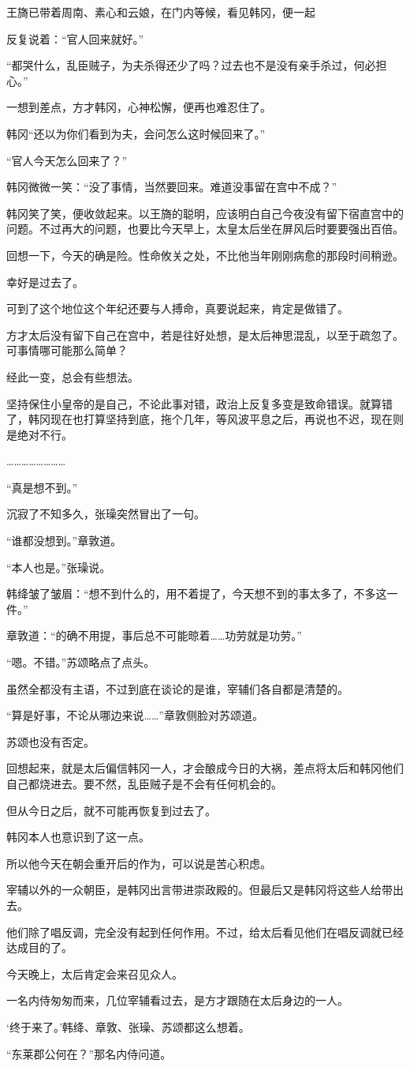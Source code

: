 王旖已带着周南、素心和云娘，在门内等候，看见韩冈，便一起

反复说着：“官人回来就好。”

“都哭什么，乱臣贼子，为夫杀得还少了吗？过去也不是没有亲手杀过，何必担心。”

一想到差点，方才韩冈，心神松懈，便再也难忍住了。

韩冈“还以为你们看到为夫，会问怎么这时候回来了。”

“官人今天怎么回来了？”

韩冈微微一笑：“没了事情，当然要回来。难道没事留在宫中不成？”

韩冈笑了笑，便收敛起来。以王旖的聪明，应该明白自己今夜没有留下宿直宫中的问题。不过再大的问题，也要比今天早上，太皇太后坐在屏风后时要要强出百倍。

回想一下，今天的确是险。性命攸关之处，不比他当年刚刚病愈的那段时间稍逊。

幸好是过去了。

可到了这个地位这个年纪还要与人搏命，真要说起来，肯定是做错了。

方才太后没有留下自己在宫中，若是往好处想，是太后神思混乱，以至于疏忽了。可事情哪可能那么简单？

经此一变，总会有些想法。

坚持保住小皇帝的是自己，不论此事对错，政治上反复多变是致命错误。就算错了，韩冈现在也打算坚持到底，拖个几年，等风波平息之后，再说也不迟，现在则是绝对不行。

……………………

“真是想不到。”

沉寂了不知多久，张璪突然冒出了一句。

“谁都没想到。”章敦道。

“本人也是。”张璪说。

韩绛皱了皱眉：“想不到什么的，用不着提了，今天想不到的事太多了，不多这一件。”

章敦道：“的确不用提，事后总不可能晾着……功劳就是功劳。”

“嗯。不错。”苏颂略点了点头。

虽然全都没有主语，不过到底在谈论的是谁，宰辅们各自都是清楚的。

“算是好事，不论从哪边来说……”章敦侧脸对苏颂道。

苏颂也没有否定。

回想起来，就是太后偏信韩冈一人，才会酿成今日的大祸，差点将太后和韩冈他们自己都烧进去。要不然，乱臣贼子是不会有任何机会的。

但从今日之后，就不可能再恢复到过去了。

韩冈本人也意识到了这一点。

所以他今天在朝会重开后的作为，可以说是苦心积虑。

宰辅以外的一众朝臣，是韩冈出言带进崇政殿的。但最后又是韩冈将这些人给带出去。

他们除了唱反调，完全没有起到任何作用。不过，给太后看见他们在唱反调就已经达成目的了。

今天晚上，太后肯定会来召见众人。

一名内侍匆匆而来，几位宰辅看过去，是方才跟随在太后身边的一人。

‘终于来了。’韩绛、章敦、张璪、苏颂都这么想着。

“东莱郡公何在？”那名内侍问道。